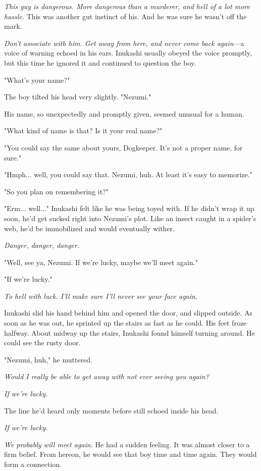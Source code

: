 \emph{This guy is dangerous. More dangerous than a murderer, and hell of a lot
more hassle.} This was another gut instinct of his. And he was sure he
wasn't off the mark.

\emph{Don't associate with him. Get away from here, and never come back
again}---a voice of warning echoed in his ears. Inukashi usually obeyed the
voice promptly, but this time he ignored it and continued to question
the boy.

"What's your name?"

The boy tilted his head very slightly. "Nezumi."

His name, so unexpectedly and promptly given, seemed unusual for a
human.

"What kind of name is that? Is it your real name?"

"You could say the same about yours, Dogkeeper. It's not a proper name,
for sure."

"Hmph... well, you could say that. Nezumi, huh. At least it's easy to
memorize."

"So you plan on remembering it?"

"Erm... well..." Inukashi felt like he was being toyed with. If he
didn't wrap it up soon, he'd get sucked right into Nezumi's plot. Like
an insect caught in a spider's web, he'd be immobilized and would
eventually wither.

\emph{Danger, danger, danger.}

"Well, see ya, Nezumi. If we're lucky, maybe we'll meet again."

"If we're lucky."

\emph{To hell with luck. I'll make sure I'll never see your face again.}

Inukashi slid his hand behind him and opened the door, and slipped
outside. As soon as he was out, he sprinted up the stairs as fast as he
could. His feet froze halfway. About midway up the stairs, Inukashi
found himself turning around. He could see the rusty door.

"Nezumi, huh," he muttered.

\emph{Would I really be able to get away with not ever seeing you again?}

\emph{If we're lucky.}

The line he'd heard only moments before still echoed inside his head.

\emph{If we're lucky.}

\emph{We probably will meet again.} He had a sudden feeling. It was almost
closer to a firm belief. From hereon, he would see that boy time and
time again. They would form a connection.

